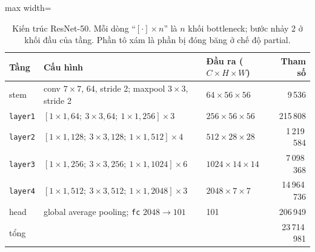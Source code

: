 \begin{table}[htbp]
\centering
\caption{Kiến trúc ResNet-50. Mỗi dòng ``\([\cdot]\times n\)'' là \(n\) khối bottleneck; bước nhảy 2 ở khối đầu của tầng. Phần tô xám là phần bị đóng băng ở chế độ partial.}
\label{tab:a1-resnet}
\small
\begin{adjustbox}{max width=\linewidth}
\begin{tabular}{lllr}
\toprule
Tầng & Cấu hình & Đầu ra (\(C\times H\times W\)) & Tham số \\
\midrule
\rowcolor{black!8} stem & conv \(7\times7\), 64, stride 2; maxpool \(3\times3\), stride 2 & \(64\times56\times56\) & 9\,536 \\
\rowcolor{black!8} \texttt{layer1} & \(\left[1{\times}1, 64;\ 3{\times}3, 64;\ 1{\times}1, 256\right]\times3\) & \(256\times56\times56\) & 215\,808 \\
\rowcolor{black!8} \texttt{layer2} & \(\left[1{\times}1, 128;\ 3{\times}3, 128;\ 1{\times}1, 512\right]\times4\) & \(512\times28\times28\) & 1\,219\,584 \\
\texttt{layer3} & \(\left[1{\times}1, 256;\ 3{\times}3, 256;\ 1{\times}1, 1024\right]\times6\) & \(1024\times14\times14\) & 7\,098\,368 \\
\texttt{layer4} & \(\left[1{\times}1, 512;\ 3{\times}3, 512;\ 1{\times}1, 2048\right]\times3\) & \(2048\times7\times7\) & 14\,964\,736 \\
head & global average pooling; \texttt{fc} \(2048\to101\) & 101 & 206\,949 \\
\midrule
tổng & & & 23\,714\,981 \\
\bottomrule
\end{tabular}
\end{adjustbox}
\end{table}

